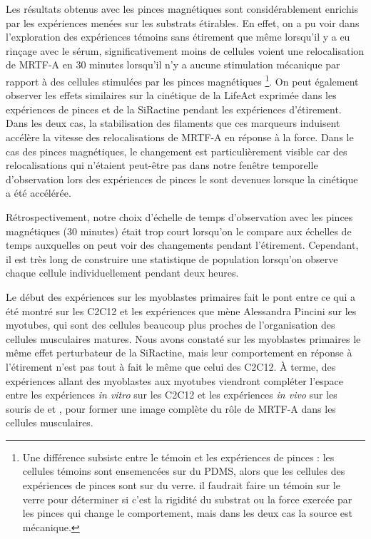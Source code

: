 Les résultats obtenus avec les pinces magnétiques sont considérablement enrichis par les expériences menées sur les substrats étirables. En effet, on a pu voir dans l'exploration des expériences témoins sans étirement que même lorsqu'il y a eu rinçage avec le sérum, significativement moins de cellules voient une relocalisation de MRTF-A en 30 minutes lorsqu'il n'y a aucune stimulation mécanique par rapport à des cellules stimulées par les pinces magnétiques \footnote{Une différence subsiste entre le témoin et les expériences de pinces : les cellules témoins sont ensemencées sur du PDMS, alors que les cellules des expériences de pinces sont sur du verre. il faudrait faire un témoin sur le verre pour déterminer si c'est la rigidité du substrat ou la force exercée par les pinces qui change le comportement, mais dans les deux cas la source est mécanique. }. On peut également observer les effets similaires sur la cinétique de la LifeAct exprimée dans les expériences de pinces et de la SiRactine pendant les expériences d'étirement. Dans les deux cas, la stabilisation des filaments que ces marqueurs induisent accélère la vitesse des relocalisations de MRTF-A en réponse à la force. Dans le cas des pinces magnétiques, le changement est particulièrement visible car des relocalisations qui n'étaient peut-être pas dans notre fenêtre temporelle d'observation lors des expériences de pinces le sont devenues lorsque la cinétique a été accélérée. 

Rétrospectivement, notre choix d'échelle de temps d'observation avec les pinces magnétiques (30 minutes) était trop court lorsqu'on le compare aux échelles de temps auxquelles on peut voir des changements pendant l'étirement. Cependant, il est très long de construire une statistique de population lorsqu'on observe chaque cellule individuellement pendant deux heures. 

Le début des expériences sur les myoblastes primaires fait le pont entre ce qui a été montré sur les C2C12 et les expériences que mène Alessandra Pincini sur les myotubes, qui sont des cellules beaucoup plus proches de l'organisation des cellules musculaires matures. 
Nous avons constaté sur les myoblastes primaires le même effet perturbateur de la SiRactine, mais leur comportement en réponse à l'étirement n'est pas tout à fait le même que celui des C2C12. 
À terme, des expériences allant des myoblastes aux myotubes viendront compléter l'espace entre les expériences \textit{in vitro} sur les C2C12 et les expériences \textit{in vivo} sur les souris de \cite{guerci_srf-dependent_2012} et \cite{collard_nuclear_2014}, pour former une image complète du rôle de MRTF-A dans les cellules musculaires. 


